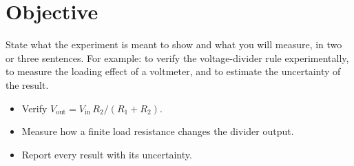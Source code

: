 \section{Objective}

State what the experiment is meant to show and what you will measure, in two or three sentences.
For example: to verify the voltage-divider rule experimentally, to measure the loading effect of a
voltmeter, and to estimate the uncertainty of the result.

\begin{notebox}[Goals]
\begin{itemize}
  \item Verify $V_\mathrm{out}=V_\mathrm{in}\,R_2/(R_1+R_2)$.
  \item Measure how a finite load resistance changes the divider output.
  \item Report every result with its uncertainty.
\end{itemize}
\end{notebox}
